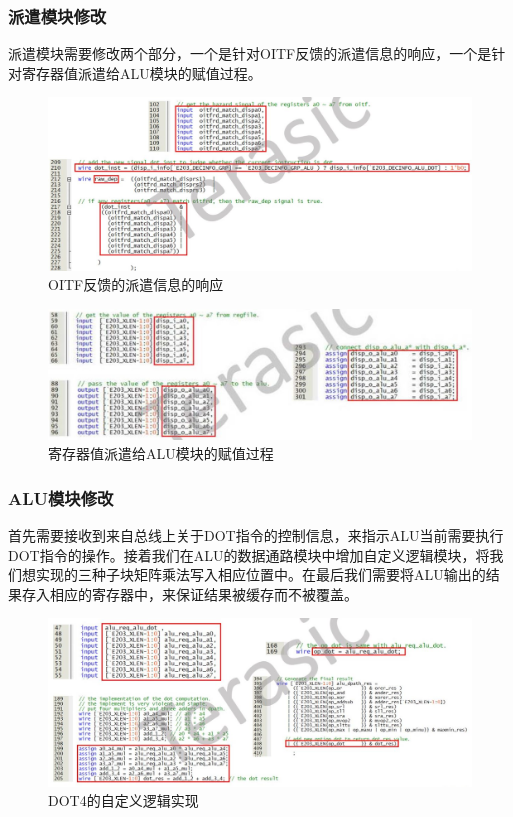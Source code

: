 \documentclass[a4paper, 14pt, oneside]{book} %
\numberwithin{equation}{subsection}
\begin{document}
	\subsubsection{派遣模块修改}
	派遣模块需要修改两个部分，一个是针对OITF反馈的派遣信息的响应，一个是针对寄存器值派遣给ALU模块的赋值过程。
	\begin{figure}[H]
		\centering
		\includegraphics[scale=0.6]{img/dispatch1.jpg}
		\caption{OITF反馈的派遣信息的响应}
	\end{figure}
	\begin{figure}[H]
		\centering
		\includegraphics[scale=0.6]{img/dispatch2.jpg}
		\caption{寄存器值派遣给ALU模块的赋值过程}
	\end{figure}

	\subsubsection{ALU模块修改}
	首先需要接收到来自总线上关于DOT指令的控制信息，来指示ALU当前需要执行DOT指令的操作。接着我们在ALU的数据通路模块中增加自定义逻辑模块，将我们想实现的三种子块矩阵乘法写入相应位置中。在最后我们需要将ALU输出的结果存入相应的寄存器中，来保证结果被缓存而不被覆盖。
	\begin{figure}[H]
		\centering
		\includegraphics[scale=0.7]{img/alu.jpg}
		\caption{DOT4的自定义逻辑实现}
	\end{figure}
\end{document}
